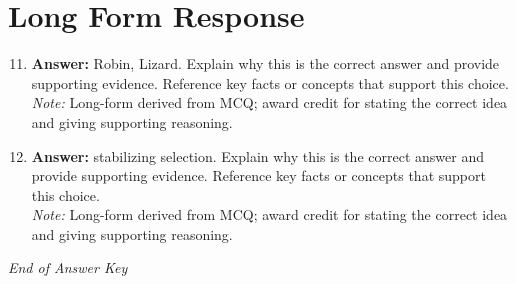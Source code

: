 \documentclass[12pt]{article}
\begin{document}
\section*{Long Form Response}
\begin{enumerate}[label=\arabic*.]
\setcounter{enumi}{10}
\item \textbf{Answer:} Robin, Lizard. Explain why this is the correct answer and provide supporting evidence. Reference key facts or concepts that support this choice.
\\ \textit{Note:} Long-form derived from MCQ; award credit for stating the correct idea and giving supporting reasoning.
\item \textbf{Answer:} stabilizing selection. Explain why this is the correct answer and provide supporting evidence. Reference key facts or concepts that support this choice.
\\ \textit{Note:} Long-form derived from MCQ; award credit for stating the correct idea and giving supporting reasoning.
\end{enumerate}

\vfill
\noindent\textit{End of Answer Key}
\end{document}
